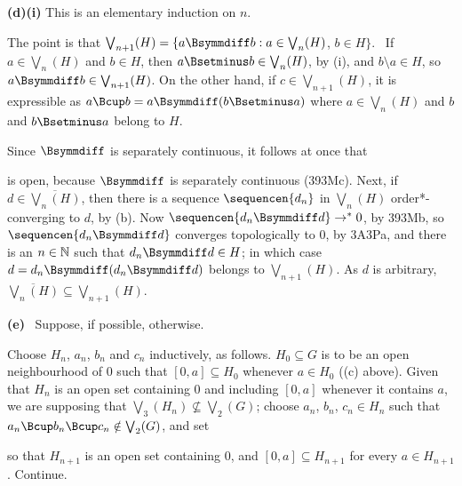{\medskip

{\bf (d)(i)} This is an elementary induction on $n$.

\medskip

 The point is that
$\bigvee_{n+1}(H)=\{a\Bsymmdiff b:a\in\bigvee_n(H)$, $b\in H\}$.
\Prf\ If $a\in\bigvee_n(H)$ and $b\in H$, then
$a\Bsetminus b\in\bigvee_n(H)$, by (i), and $b\setminus a\in H$, so
$a\Bsymmdiff b\in\bigvee_{n+1}(H)$.   On the other hand, if
$c\in\bigvee_{n+1}(H)$, it is expressible as
$a\Bcup b=a\Bsymmdiff(b\Bsetminus a)$ where $a\in\bigvee_n(H)$ and $b$ and
$b\Bsetminus a$ belong to $H$.\ \Qed

Since $\Bsymmdiff$ is separately continuous, it follows at once that


\noindent is open, because $\Bsymmdiff$ is separately continuous (393Mc).
Next, if $d\in\overline{\bigvee_n(H)}$, then
there is a sequence $\sequencen{d_n}$ in
$\bigvee_n(H)$ order*-converging to $d$, by (b).   Now
$\sequencen{d_n\Bsymmdiff d}\to^* 0$, by 393Mb, so
$\sequencen{d_n\Bsymmdiff d}$ converges topologically to $0$, by 3A3Pa, and
there is an $n\in\Bbb N$ such that $d_n\Bsymmdiff d\in H$;  in which case
$d=d_n\Bsymmdiff(d_n\Bsymmdiff d)$ belongs to $\bigvee_{n+1}(H)$.
As $d$ is arbitrary, $\overline{\bigvee_n(H)}\subseteq\bigvee_{n+1}(H)$.

\medskip

{\bf (e)} \Quer\ Suppose, if possible, otherwise.

\medskip

 Choose $H_n$, $a_n$, $b_n$ and $c_n$
inductively, as follows.   $H_0\subseteq G$ is to be an open neighbourhood
of $0$ such that $[0,a]\subseteq H_0$ whenever $a\in H_0$
((c) above).   Given that $H_n$ is an open set
containing $0$ and including $[0,a]$ whenever it contains $a$,
we are supposing that
$\bigvee_3(H_n)\not\subseteq\bigvee_2(G)$;
choose $a_n$, $b_n$, $c_n\in H_n$ such that
$a_n\Bcup b_n\Bcup c_n\notin\bigvee_2(G)$, and set


\noindent so that $H_{n+1}$ is an open set containing $0$,
and $[0,a]\subseteq H_{n+1}$ for every $a\in H_{n+1}$.
Continue.

\medskip

}
